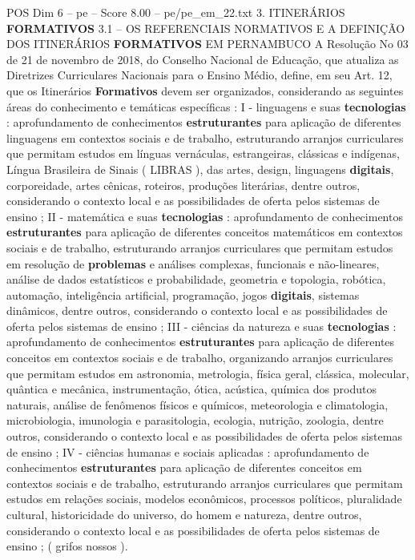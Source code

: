 \begin{textsample}{POS Dim 6 – pe – Score 8.00 – pe/pe\_em\_22.txt}  \label{ex:f6_pos_252}
3.
ITINERÁRIOS \textbf{FORMATIVOS} 3.1 – OS REFERENCIAIS NORMATIVOS E A DEFINIÇÃO DOS ITINERÁRIOS \textbf{FORMATIVOS} EM PERNAMBUCO A Resolução No 03 de 21 de novembro de 2018, do Conselho Nacional de Educação, que atualiza as Diretrizes Curriculares Nacionais para o Ensino Médio, define, em seu Art. 12, que os Itinerários \textbf{Formativos} devem ser organizados, considerando as seguintes áreas do conhecimento e temáticas específicas : I - linguagens e suas \textbf{tecnologias} : aprofundamento de conhecimentos \textbf{estruturantes} para aplicação de diferentes linguagens em contextos sociais e de trabalho, estruturando arranjos curriculares que permitam estudos em línguas vernáculas, estrangeiras, clássicas e indígenas, Língua Brasileira de Sinais ( LIBRAS ), das artes, design, linguagens \textbf{digitais}, corporeidade, artes cênicas, roteiros, produções literárias, dentre outros, considerando o contexto local e as possibilidades de oferta pelos sistemas de ensino ; II - matemática e suas \textbf{tecnologias} : aprofundamento de conhecimentos \textbf{estruturantes} para aplicação de diferentes conceitos matemáticos em contextos sociais e de trabalho, estruturando arranjos curriculares que permitam estudos em resolução de \textbf{problemas} e análises complexas, funcionais e não-lineares, análise de dados estatísticos e probabilidade, geometria e topologia, robótica, automação, inteligência artificial, programação, jogos \textbf{digitais}, sistemas dinâmicos, dentre outros, considerando o contexto local e as possibilidades de oferta pelos sistemas de ensino ; III - ciências da natureza e suas \textbf{tecnologias} : aprofundamento de conhecimentos \textbf{estruturantes} para aplicação de diferentes conceitos em contextos sociais e de trabalho, organizando arranjos curriculares que permitam estudos em astronomia, metrologia, física geral, clássica, molecular, quântica e mecânica, instrumentação, ótica, acústica, química dos produtos naturais, análise de fenômenos físicos e químicos, meteorologia e climatologia, microbiologia, imunologia e parasitologia, ecologia, nutrição, zoologia, dentre outros, considerando o contexto local e as possibilidades de oferta pelos sistemas de ensino ; IV - ciências humanas e sociais aplicadas : aprofundamento de conhecimentos \textbf{estruturantes} para aplicação de diferentes conceitos em contextos sociais e de trabalho, estruturando arranjos curriculares que permitam estudos em relações sociais, modelos econômicos, processos políticos, pluralidade cultural, historicidade do universo, do homem e natureza, dentre outros, considerando o contexto local e as possibilidades de oferta pelos sistemas de ensino ; ( grifos nossos ).

\end{textsample}
